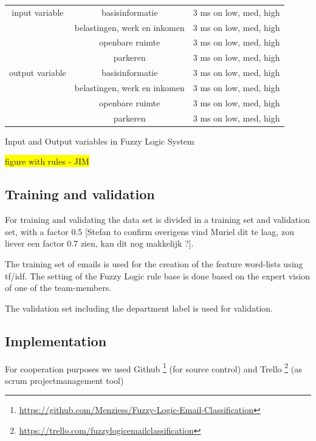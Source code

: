 \documentclass[journal]{IEEEtran}
\begin{document}
\begin{center}
\begin{tabular}{ |c|c|c| }
 \hline
 input variable & basisinformatie   & 3 ms on low, med, high    \\
                & belastingen, werk en inkomen & 3 ms on low, med, high \\
                & openbare ruimte   & 3 ms on low, med, high    \\
                & parkeren          & 3 ms on low, med, high    \\
 output variable& basisinformatie   & 3 ms on low, med, high    \\
                & belastingen, werk en inkomen & 3 ms on low, med, high \\
                & openbare ruimte   & 3 ms on low, med, high    \\
                & parkeren          & 3 ms on low, med, high    \\
\hline
\end{tabular}
\label{table:1}
Input and Output variables in Fuzzy Logic System
\end{center}

\colorbox{yellow}{figure with rules - JIM}

\subsection{Training and validation}

For training and validating the data set is divided in a training set and validation set, with a factor 0.5 [Stefan to confirm overigens vind Muriel dit te laag, zou liever een factor 0.7 zien, kan dit nog makkelijk ?]. 

The training set of emails is used for the creation of the feature word-lists using tf/idf. The setting of the Fuzzy Logic rule base is done based on the expert vision of one of the team-members. 

The validation set including the department label is used for validation. 

\subsection{Implementation}

For cooperation purposes we used Github \footnote{\url{https://github.com/Menziess/Fuzzy-Logic-Email-Classification}} (for source control) and Trello \footnote{\url{https://trello.com/fuzzylogicemailclassification}} (as scrum projectmanagement tool)
\end{document}
